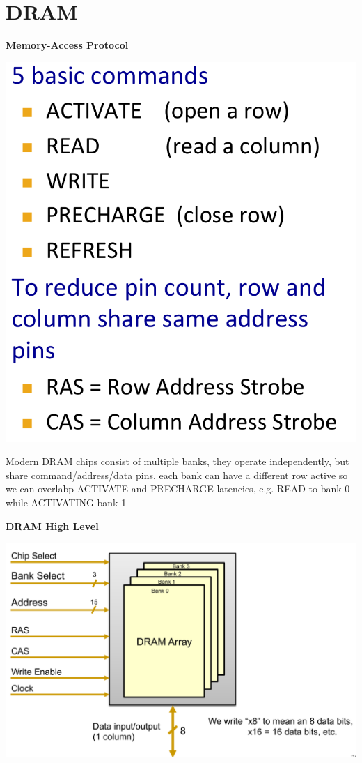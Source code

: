\section{DRAM}

\textbf{Memory-Access Protocol}

\includegraphics[width=\linewidth]{png/dram.png}

Modern DRAM chips consist of multiple banks, they operate independently, but
share command/address/data pins, each bank can have a different row active so we
can overlabp ACTIVATE and PRECHARGE latencies, e.g. READ to bank 0 while ACTIVATING bank 1

\textbf{DRAM High Level}

\includegraphics[width=\linewidth]{png/drambank.png}

